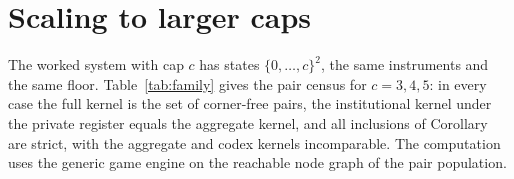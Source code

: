 \section{Scaling to larger caps}\label{si:family}

The worked system with cap $c$ has states $\{0,\dots,c\}^2$, the same instruments and the same floor. Table~\ref{tab:family} gives the pair census for $c=3,4,5$: in every case the full kernel is the set of corner-free pairs, the institutional kernel under the private register equals the aggregate kernel, and all inclusions of Corollary~ are strict, with the aggregate and codex kernels incomparable. The computation uses the generic game engine on the reachable node graph of the pair population.


